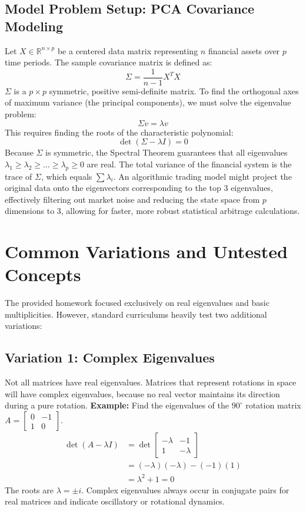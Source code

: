 \documentclass[11pt, a4paper]{article}
\theoremstyle{definition}
\theoremstyle{remark}
\newcommand{\R}{\mathbb{R}}
\begin{document}
\subsection{Model Problem Setup: PCA Covariance Modeling}
Let $X \in \R^{n \times p}$ be a centered data matrix representing $n$ financial assets over $p$ time periods. The sample covariance matrix is defined as:
\[ \Sigma = \frac{1}{n-1} X^T X \]
$\Sigma$ is a $p \times p$ symmetric, positive semi-definite matrix. To find the orthogonal axes of maximum variance (the principal components), we must solve the eigenvalue problem:
\[ \Sigma v = \lambda v \]
This requires finding the roots of the characteristic polynomial:
\[ \det(\Sigma - \lambda I) = 0 \]
Because $\Sigma$ is symmetric, the Spectral Theorem guarantees that all eigenvalues $\lambda_1 \geq \lambda_2 \geq \dots \geq \lambda_p \geq 0$ are real. The total variance of the financial system is the trace of $\Sigma$, which equals $\sum \lambda_i$. An algorithmic trading model might project the original data onto the eigenvectors corresponding to the top 3 eigenvalues, effectively filtering out market noise and reducing the state space from $p$ dimensions to 3, allowing for faster, more robust statistical arbitrage calculations.

\newpage
\section{Common Variations and Untested Concepts}

The provided homework focused exclusively on real eigenvalues and basic multiplicities. However, standard curriculums heavily test two additional variations:

\subsection{Variation 1: Complex Eigenvalues}
Not all matrices have real eigenvalues. Matrices that represent rotations in space will have complex eigenvalues, because no real vector maintains its direction during a pure rotation.
\textbf{Example:} Find the eigenvalues of the $90^\circ$ rotation matrix $A = \begin{bmatrix} 0 & -1 \\ 1 & 0 \end{bmatrix}$.
\begin{align*}
    \det(A - \lambda I) &= \det \begin{bmatrix} -\lambda & -1 \\ 1 & -\lambda \end{bmatrix} \\
    &= (-\lambda)(-\lambda) - (-1)(1) \\
    &= \lambda^2 + 1 = 0
\end{align*}
The roots are $\lambda = \pm i$. Complex eigenvalues always occur in conjugate pairs for real matrices and indicate oscillatory or rotational dynamics.
\end{document}
